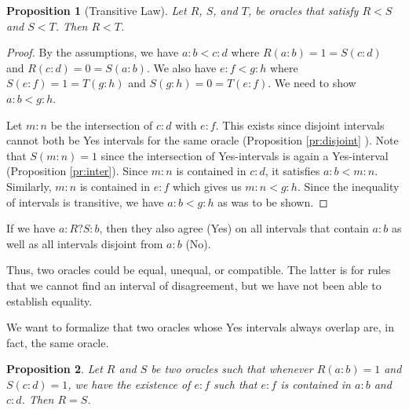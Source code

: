 \documentclass[12pt]{article}
\newtheorem{proposition}{Proposition}
\theoremstyle{remark}
\begin{document}
\begin{proposition}[Transitive Law]\label{pr:transitive}
Let $R$, $S$, and $T$, be oracles that satisfy $R<S$ and $S < T$. Then $R < T$.
\end{proposition}

\begin{proof}
By the assumptions, we have $a:b < c:d$ where $R(a:b) = 1 = S(c:d)$ and $R(c:d) = 0 = S(a:b)$. We also have $e:f < g:h$ where $S(e:f) = 1 = T(g:h)$ and $S(g:h) = 0 = T(e:f)$. We need to show $a:b < g:h$.

Let $m:n$ be the intersection of $c:d$ with $e:f$. This exists since disjoint intervals cannot both be Yes intervals for the same oracle (Proposition \ref{pr:disjoint} ). Note that $S(m:n) = 1$ since the intersection of Yes-intervals is again a Yes-interval (Proposition \ref{pr:inter}). Since $m:n$ is contained in $c:d$, it satisfies $a:b < m:n$. Similarly, $m:n$ is contained in $e:f$ which gives us $m:n < g:h$. Since the inequality of intervals is transitive, we have $a:b < g:h$ as was to be shown. 
\end{proof}


If we have $a:R?S:b$, then they also agree (Yes) on all intervals that contain $a:b$ as well as all intervals disjoint from $a:b$ (No). 

Thus, two oracles could be equal, unequal, or compatible. The latter is for rules that we cannot find an interval of disagreement, but we have not been able to establish equality. 

We want to formalize that two oracles whose Yes intervals always overlap are, in fact, the same oracle.

\begin{proposition}\label{pr:overlap}
Let $R$ and $S$ be two oracles such that whenever $R(a:b)=1$ and $S(c:d)=1$, we have the existence of $e:f$ such that $e:f$ is contained in $a:b$ and $c:d$.  Then $R =S$.
\end{proposition}
\end{document}
